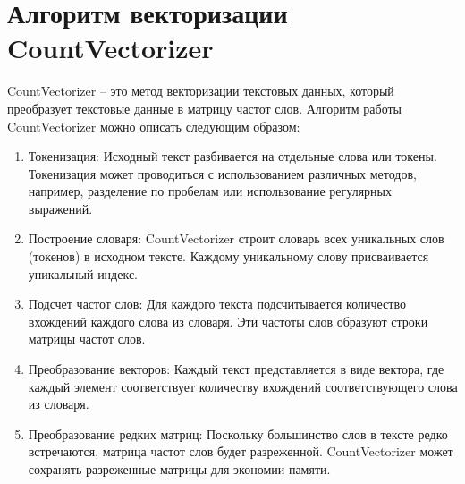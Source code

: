 \documentclass[12pt]{report}
\begin{document}
\section{Алгоритм векторизации CountVectorizer}
CountVectorizer -- это метод векторизации текстовых данных, который преобразует текстовые данные в матрицу частот слов. Алгоритм работы CountVectorizer можно описать следующим образом:
\begin{enumerate}
    \item Токенизация: Исходный текст разбивается на отдельные слова или токены. Токенизация может проводиться с использованием различных методов, например, разделение по пробелам или использование регулярных выражений.

    \item Построение словаря: CountVectorizer строит словарь всех уникальных слов (токенов) в исходном тексте. Каждому уникальному слову присваивается уникальный индекс.

    \item Подсчет частот слов: Для каждого текста подсчитывается количество вхождений каждого слова из словаря. Эти частоты слов образуют строки матрицы частот слов.

    \item Преобразование векторов: Каждый текст представляется в виде вектора, где каждый элемент соответствует количеству вхождений соответствующего слова из словаря.

    \item Преобразование редких матриц: Поскольку большинство слов в тексте редко встречаются, матрица частот слов будет разреженной. CountVectorizer может сохранять разреженные матрицы для экономии памяти.
\end{enumerate}
\end{document}

